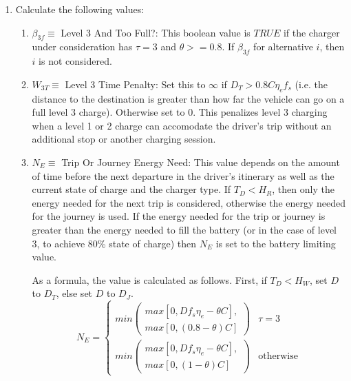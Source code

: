 \documentclass[journal]{IEEEtran}
\begin{document}
\begin{enumerate}[label=(\alph*)]
  \item Calculate the following values: 
  \begin{enumerate}[label=(\roman*)]
    \item $\beta_{3f} \equiv$ Level 3 And Too Full?: This boolean value is $TRUE$ if the charger under consideration has $\tau = 3$ and $\theta >= 0.8$. If $\beta_{3f}$ for alternative $i$, then $i$ is not considered.
    \item $W_{3T} \equiv$ Level 3 Time Penalty: Set this to $\infty$ if $D_T > 0.8 C \eta_e f_s$ (i.e. the distance to the destination is greater than how far the vehicle can go on a full level 3 charge). Otherwise set to 0.  This penalizes level 3 charging when a level 1 or 2 charge can accomodate the driver's trip without an additional stop or another charging session.
    \item $N_E \equiv$ Trip Or Journey Energy Need: This value depends on the amount of time before the next departure in the driver's itinerary as well as the current state of charge and the charger type.  If $T_D < H_R$, then only the energy needed for the next trip is considered, otherwise the energy needed for the journey is used.  If the energy needed for the trip or journey is greater than the energy needed to fill the battery (or in the case of level 3, to achieve 80\% state of charge) then $N_E$ is set to the battery limiting value.

    As a formula, the value is calculated as follows. First, if $T_D < H_W$, set $D$ to $D_T$, else set $D$ to $D_J$. 
    \begin{equation}
      N_E = 
      \begin{cases}
	min\left(\substack{ max\left[0,D f_s \eta_e - \theta C \right],\\
	max⁡\left[0,(0.8-\theta)C \right] }\right) & \tau = 3 \\
	min\left(\substack{max\left[0,D f_s \eta_e - \theta C \right],\\
	max⁡\left[0,(1-\theta)C \right] }\right) & \text{otherwise}
      \end{cases}
    \end{equation}
	  

\end{enumerate}
\end{enumerate}
\end{document}
